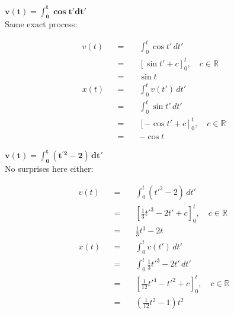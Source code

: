 \documentclass[solutions.tex]{subfiles}
\begin{document}
\hr
$\bm{v(t) = \int_0^t \cos t' dt'}$\\
Same exact process:

\begin{equation*} \begin{aligned}
	v(t) &&=\quad& \int_0^t \cos t'\,dt' \\
	~ &&=\quad& \left[\sin t' + c\right]_0^t,\quad c\in\mathbb{R} \\
	~ &&=\quad& \boxed{\sin t} \\
	x(t) &&=\quad& \int_0^t v(t')\,dt' \\
	~ &&=\quad& \int_0^t \sin t'\,dt' \\
	~ &&=\quad& \left[-\cos t' + c\right]_0^t,\quad c\in\mathbb{R} \\
	~ &&=\quad& \boxed{-\cos t}
\end{aligned} \end{equation*}

\hr
$\bm{v(t) = \int_0^t (t^{'2}-2)\,dt'}$\\
No surprises here either:

\begin{equation*} \begin{aligned}
	v(t) &&=\quad& \int_0^t (t'^2-2)\,dt' \\
	~ &&=\quad& \left[\frac13t'^3 -2t' + c\right]_0^t,\quad c\in\mathbb{R} \\
	~ &&=\quad& \boxed{\frac13t^3-2t} \\
	x(t) &&=\quad& \int_0^t v(t')\,dt' \\
	~ &&=\quad& \int_0^t \frac13t'^3-2t'\,dt' \\
	~ &&=\quad& \left[\frac1{12}t'^4 -t'^2 + c\right]_0^t,\quad c\in\mathbb{R} \\
	~ &&=\quad& \boxed{\left(\frac1{12}t^2 -1\right)t^2}
\end{aligned} \end{equation*}
\end{document}
